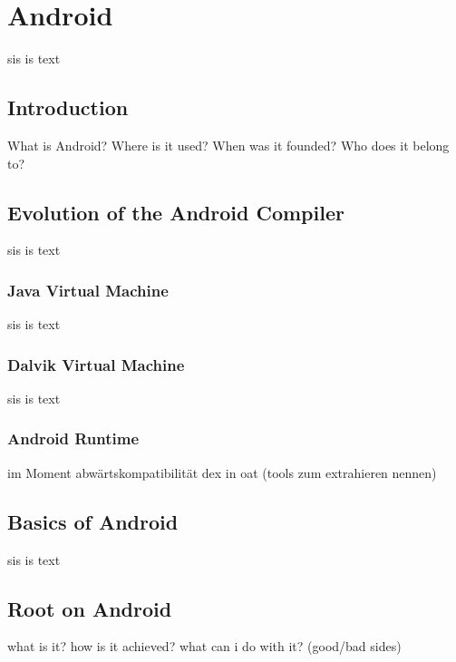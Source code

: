 \section{Android}\label{section:android}
sis is text\newline
\subsection{Introduction}\label{subsection:android-history}
What is Android? Where is it used? When was it founded? Who does it belong to?
\subsection{Evolution of the Android Compiler}\label{subsection:android-evolution}
sis is text
\subsubsection{Java Virtual Machine}\label{subsubsection:android-evolution-jvm}
sis is text
\subsubsection{Dalvik Virtual Machine}\label{subsubsection:android-evolution-dvm}
sis is text
\subsubsection{Android Runtime}\label{subsubsection:android-evolution-art}
im Moment abwärtskompatibilität dex in oat (tools zum extrahieren nennen)
\subsection{Basics of Android}\label{subsection:android-basics}
sis is text
\subsection{Root on Android}\label{subsection:android-root}
what is it? how is it achieved? what can i do with it? (good/bad sides)
